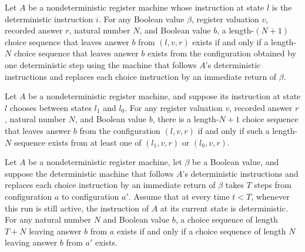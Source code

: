 \begin{lemma}
\label{Complexity.LogProg.nans_det}
\leanok
{}
Let $A$ be a nondeterministic register machine whose instruction at state $l$ is the
deterministic instruction $i$. For any Boolean value $\beta$, register valuation $v$,
recorded answer $r$, natural number $N$, and Boolean value $b$, a length-$(N+1)$ choice
sequence that leaves answer $b$ from $(l,v,r)$ exists if and only if a length-$N$ choice
sequence that leaves answer $b$ exists from the configuration obtained by one
deterministic step using the machine that follows $A$'s deterministic instructions and
replaces each choice instruction by an immediate return of $\beta$.
\end{lemma}

\begin{lemma}
\label{Complexity.LogProg.nans_choose}
\leanok
{}
Let $A$ be a nondeterministic register machine, and suppose its instruction at state $l$
chooses between states $l_1$ and $l_0$. For any register valuation $v$, recorded answer
$r$, natural number $N$, and Boolean value $b$, there is a length-$N+1$ choice sequence
that leaves answer $b$ from the configuration $(l,v,r)$ if and only if such a length-$N$
sequence exists from at least one of $(l_1,v,r)$ or $(l_0,v,r)$.
\end{lemma}

\begin{lemma}
\label{Complexity.LogProg.nans_run}
\leanok
{}
Let $A$ be a nondeterministic register machine, let $\beta$ be a Boolean value, and
suppose the deterministic machine that follows $A$'s deterministic instructions and
replaces each choice instruction by an immediate return of $\beta$ takes $T$ steps from
configuration $a$ to configuration $a'$. Assume that at every time $t<T$, whenever this
run is still active, the instruction of $A$ at its current state is deterministic. For
any natural number $N$ and Boolean value $b$, a choice sequence of length $T+N$ leaving
answer $b$ from $a$ exists if and only if a choice sequence of length $N$ leaving answer
$b$ from $a'$ exists.
\end{lemma}

